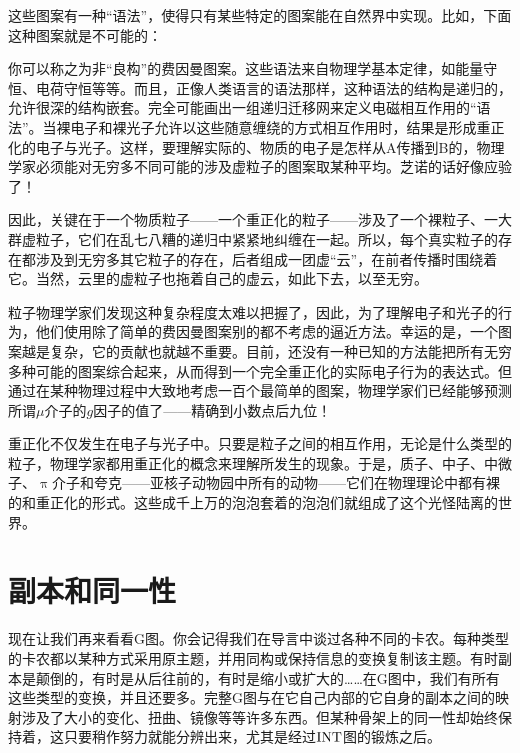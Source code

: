 这些图案有一种“语法”，使得只有某些特定的图案能在自然界中实现。比如，下面这种图案就是不可能的：
\begin{figure}[H]
\end{figure}
你可以称之为非“良构”的费因曼图案。这些语法来自物理学基本定律，如能量守恒、电荷守恒等等。而且，正像人类语言的语法那样，这种语法的结构是递归的，允许很深的结构嵌套。完全可能画出一组递归迁移网来定义电磁相互作用的“语法”。当裸电子和裸光子允许以这些随意缠绕的方式相互作用时，结果是形成重正化的电子与光子。这样，要理解实际的、物质的电子是怎样从A传播到B的，物理学家必须能对无穷多不同可能的涉及虚粒子的图案取某种平均。芝诺的话好像应验了！

因此，关键在于一个物质粒子——一个重正化的粒子——涉及了一个裸粒子、一大群虚粒子，它们在乱七八糟的递归中紧紧地纠缠在一起。所以，每个真实粒子的存在都涉及到无穷多其它粒子的存在，后者组成一团虚“云”，在前者传播时围绕着它。当然，云里的虚粒子也拖着自己的虚云，如此下去，以至无穷。

粒子物理学家们发现这种复杂程度太难以把握了，因此，为了理解电子和光子的行为，他们使用除了简单的费因曼图案别的都不考虑的逼近方法。幸运的是，一个图案越是复杂，它的贡献也就越不重要。目前，还没有一种已知的方法能把所有无穷多种可能的图案综合起来，从而得到一个完全重正化的实际电子行为的表达式。但通过在某种物理过程中大致地考虑一百个最简单的图案，物理学家们已经能够预测所谓$\mu$介子的$g$因子的值了——精确到小数点后九位！

重正化不仅发生在电子与光子中。只要是粒子之间的相互作用，无论是什么类型的粒子，物理学家都用重正化的概念来理解所发生的现象。于是，质子、中子、中微子、$\uppi$介子和夸克——亚核子动物园中所有的动物——它们在物理理论中都有裸的和重正化的形式。这些成千上万的泡泡套着的泡泡们就组成了这个光怪陆离的世界。

\section{副本和同一性}

现在让我们再来看看G图。你会记得我们在导言中谈过各种不同的卡农。每种类型的卡农都以某种方式采用原主题，并用同构或保持信息的变换复制该主题。有时副本是颠倒的，有时是从后往前的，有时是缩小或扩大的……在G图中，我们有所有这些类型的变换，并且还要多。完整G图与在它自己内部的它自身的副本之间的映射涉及了大小的变化、扭曲、镜像等等许多东西。但某种骨架上的同一性却始终保持着，这只要稍作努力就能分辨出来，尤其是经过$\operatorname{INT}$图的锻炼之后。

